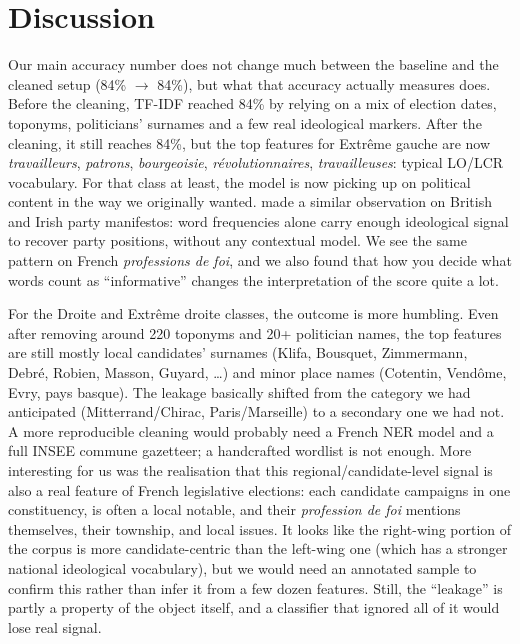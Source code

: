 \documentclass{article}
\begin{document}
\section{Discussion}
\label{sec:discussion}

Our main accuracy number does not change much between the baseline and the cleaned setup (84\% $\to$ 84\%), but what that accuracy actually measures does. Before the cleaning, TF-IDF reached 84\% by relying on a mix of election dates, toponyms, politicians' surnames and a few real ideological markers. After the cleaning, it still reaches 84\%, but the top features for Extr\^{e}me gauche are now \textit{travailleurs}, \textit{patrons}, \textit{bourgeoisie}, \textit{révolutionnaires}, \textit{travailleuses}: typical LO/LCR vocabulary. For that class at least, the model is now picking up on political content in the way we originally wanted. \citet{laver2003extracting} made a similar observation on British and Irish party manifestos: word frequencies alone carry enough ideological signal to recover party positions, without any contextual model. We see the same pattern on French \textit{professions de foi}, and we also found that how you decide what words count as ``informative'' changes the interpretation of the score quite a lot.

For the Droite and Extr\^{e}me droite classes, the outcome is more humbling. Even after removing around 220 toponyms and 20+ politician names, the top features are still mostly local candidates' surnames (Klifa, Bousquet, Zimmermann, Debré, Robien, Masson, Guyard, \ldots) and minor place names (Cotentin, Vendôme, Evry, pays basque). The leakage basically shifted from the category we had anticipated (Mitterrand/Chirac, Paris/Marseille) to a secondary one we had not. A more reproducible cleaning would probably need a French NER model and a full INSEE commune gazetteer; a handcrafted wordlist is not enough. More interesting for us was the realisation that this regional/candidate-level signal is also a real feature of French legislative elections: each candidate campaigns in one constituency, is often a local notable, and their \textit{profession de foi} mentions themselves, their township, and local issues. It looks like the right-wing portion of the corpus is more candidate-centric than the left-wing one (which has a stronger national ideological vocabulary), but we would need an annotated sample to confirm this rather than infer it from a few dozen features. Still, the ``leakage'' is partly a property of the object itself, and a classifier that ignored all of it would lose real signal.
\end{document}
